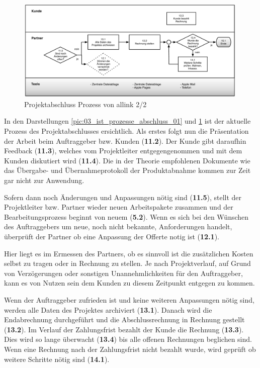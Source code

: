 \begin{figure}[p]
\begin{center}
\includegraphics[width=0.99\textwidth,angle=0]{./bilder/analyse/03_ist_prozesse_abschluss_02.pdf}
\caption[Projektabschluss Prozess von allink 2/2]{Projektabschluss 
    Prozess von allink 2/2\footnotemark}
\label{pic:03_ist_prozesse_abschluss_02}
\end{center}
\end{figure}

In den Darstellungen \ref{pic:03_ist_prozesse_abschluss_01} und
\ref{pic:03_ist_prozesse_abschluss_02} ist der aktuelle Prozess des Projektabschlusses 
ersichtlich. Als erstes folgt nun die Präsentation der Arbeit beim Auftraggeber 
bzw. Kunden (\textbf{11.2}). Der Kunde gibt daraufhin Feedback (\textbf{11.3}), 
welches vom Projektleiter entgegengenommen und mit dem Kunden diskutiert wird (\textbf{11.4}).
Die in der Theorie empfohlenen Dokumente wie das Übergabe- und Übernahmeprotokoll
der Produktabnahme kommen zur Zeit gar nicht zur Anwendung.

Sofern dann noch Änderungen und Anpassungen nötig sind (\textbf{11.5}), stellt
der Projektleiter bzw. Partner wieder neuen Arbeitspakete zusammen und der
Bearbeitungsprozess beginnt von neuem (\textbf{5.2}). Wenn es sich bei den Wünschen
des Auftraggebers um neue, noch nicht bekannte, Anforderungen handelt, überprüft
der Partner ob eine Anpassung der Offerte notig ist (\textbf{12.1}).

Hier liegt es im Ermessen des Partners, ob es sinnvoll ist die zusätzlichen Kosten 
selbst zu tragen oder in Rechnung zu stellen. Je nach Projektverlauf, auf Grund von
Verzögerungen oder sonstigen Unannehmlichkeiten für den Auftraggeber, kann es
von Nutzen sein dem Kunden zu diesem Zeitpunkt entgegen zu kommen.

Wenn der Auftraggeber zufrieden ist und keine weiteren Anpassungen nötig sind, 
werden alle Daten des Projektes archiviert (\textbf{13.1}). Danach wird die
Endabrechnung durchgeführt und die Abschlussrechnung in Rechnung gestellt (\textbf{13.2}).
Im Verlauf der Zahlungsfrist bezahlt der Kunde die Rechnung (\textbf{13.3}).
Dies wird so lange überwacht (\textbf{13.4}) bis alle offenen Rechnungen beglichen
sind. Wenn eine Rechnung nach der Zahlungsfrist nicht bezahlt wurde, wird
geprüft ob weitere Schritte nötig sind (\textbf{14.1}).

